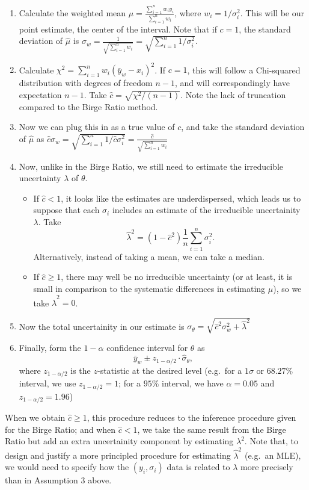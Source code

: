 \documentclass[12pt]{article}
\begin{document}
\begin{enumerate}
\item
  Calculate the weighted mean $\hat\mu=\frac{\sum_{i=1}^n w_iy_i}{\sum_{i=1}^nw_i}$, where $w_i=1/\sigma_i^2$. This will be our point estimate, the center of the interval. Note that if $c=1$, the standard deviation of $\hat\mu$ is $\sigma_w=\frac{1}{\sqrt{\sum_{i=1}^nw_i}}=\sqrt{\sum_{i=1}^n1/\sigma_i^2}$.
\item
  Calculate $\chi^2=\sum_{i=1}^n w_i(\bar{y}_w-x_i)^2$. If $c=1$, this will follow a Chi-squared distribution with degrees of freedom $n-1$, and will correspondingly have expectation $n-1$. Take $\hat c=\sqrt{\chi^2/(n-1)}$. Note the lack of truncation compared to the Birge Ratio method.
\item
  Now we can plug this in as a true value of $c$, and take the standard deviation of $\hat\mu$ as $\hat c\sigma_w=\sqrt{\sum_{i=1}^n1/\hat c\sigma_i^2}=\frac{\hat c}{\sqrt{\sum_{i=1}^nw_i}}$
\item
  Now, unlike in the Birge Ratio, we still need to estimate the irreducible uncertainty $\lambda$ of $\theta$.

  \begin{itemize}
  
  \item
    If $\hat c < 1$, it looks like the estimates are underdispersed, which leads us to suppose that each $\sigma_i$ includes an estimate of the irreducible uncertainity $\lambda$. Take \[\hat \lambda^2=(1-\hat c^2)\frac{1}{n}\sum_{i=1}^n \sigma_i^2.\] Alternatively, instead of taking a mean, we can take a median.
  \item
    If $\hat c \geq 1$, there may well be no irreducible uncertainty (or at least, it is small in comparison to the systematic differences in estimating $\mu$), so we take $\hat\lambda^2=0$.
  \end{itemize}
\item
  Now the total uncertainity in our estimate is $\sigma_\theta=\sqrt{\hat c^2\sigma_w^2 + \hat\lambda^2}$
\item
  Finally, form the $1-\alpha$ confidence interval for $\theta$ as \[\bar{y}_w\pm z_{1-{\alpha/2}}\cdot \hat \sigma_\theta,\] where $z_{1-\alpha/2}$ is the $z$-statistic at the desired level (e.g.~for a $1\sigma$ or $68.27\%$ interval, we use $z_{1-\alpha/2}=1$; for a $95\%$ interval, we have $\alpha=0.05$ and $z_{1-\alpha/2}=1.96$)
\end{enumerate}

When we obtain $\hat c\geq 1$, this procedure reduces to the inference procedure given for the Birge Ratio; and when $\hat c<1$, we take the same result from the Birge Ratio but add an extra uncertainity component by estimating $\lambda^2$. Note that, to design and justify a more principled procedure for estimating $\hat \lambda^2$ (e.g.~an MLE), we would need to specify how the $(y_i,\sigma_i)$ data is related to $\lambda$ more precisely than in Assumption 3 above.
\end{document}
